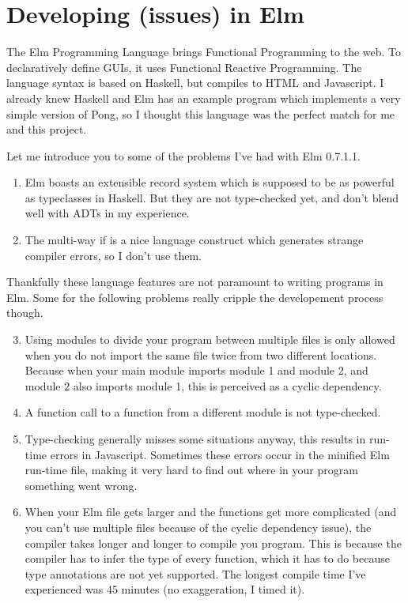 \documentclass[a4paper]{article}
\begin{document}
\section{Developing (issues) in Elm}
The Elm Programming Language brings Functional Programming to the web. To
 declaratively define GUIs, it uses Functional Reactive Programming. The
 language syntax is based on Haskell, but compiles to HTML and Javascript. 
 I already knew Haskell and Elm has an example program which implements a very
 simple version of Pong, so I thought this language was the perfect match for me
 and this project. 

Let me introduce you to some of the problems I've had with Elm 0.7.1.1.

\begin{enumerate}
\item Elm boasts an extensible record system which is supposed to be as powerful
 as typeclasses in Haskell. But they are not type-checked yet, and don't blend
 well with ADTs in my experience. 
\item The multi-way if is a nice language construct which generates strange
 compiler errors, so I don't use them. 
\end{enumerate}

Thankfully these language features are not paramount to writing programs in Elm.
 Some for the following problems really cripple the developement process though.
 
\begin{enumerate} \setcounter{enumi}{2}
\item Using modules to divide your program between multiple files is only
 allowed when you do not import the same file twice from two different
 locations. Because when your main module imports module 1 and module 2, and
 module 2 also imports module 1, this is perceived as a cyclic dependency. 
\item A function call to a function from a different module is not type-checked.
\item Type-checking generally misses some situations anyway, this results in
 run-time errors in Javascript. Sometimes these errors occur in the minified
 Elm run-time file, making it very hard to find out where in your program
 something went wrong.
\item When your Elm file gets larger and the functions get more complicated (and
 you can't use multiple files because of the cyclic dependency issue), the
 compiler takes longer and longer to compile you program. This is because the
 compiler has to infer the type of every function, which it has to do because
 type annotations are not yet supported. The longest compile time I've
 experienced was 45 minutes (no exaggeration, I timed it). 
\end{enumerate}
\end{document}
